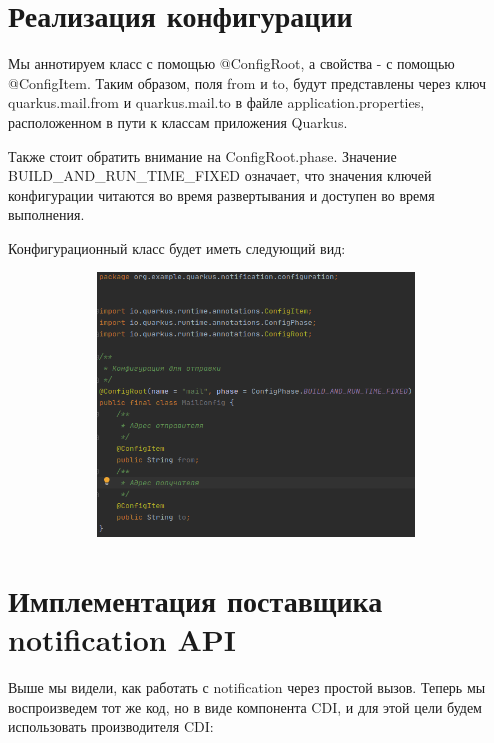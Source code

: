 \documentclass[russian,11pt]{article}
\begin{document}
\section{Реализация конфигурации}

Мы аннотируем класс с помощью @ConfigRoot, а свойства - с помощью @ConfigItem. Таким образом, поля from и to, будут представлены через ключ quarkus.mail.from и quarkus.mail.to в файле application.properties, расположенном в пути к классам приложения Quarkus.

	Также стоит обратить внимание на ConfigRoot.phase. Значение  BUILD\_AND\_RUN\_TIME\_FIXED означает, что значения ключей конфигурации читаются во время развертывания и доступен во время выполнения.
	
Конфигурационный класс будет иметь следующий вид:

\begin{figure}[H]
	\centering
	\includegraphics[scale=0.5, width=11cm, height=7cm]{6}
\end{figure}

\section{Имплементация поставщика notification API}

Выше мы видели, как работать с notification через простой вызов. Теперь мы воспроизведем тот же код, но в виде компонента CDI, и для этой цели будем использовать производителя CDI:
\end{document}
